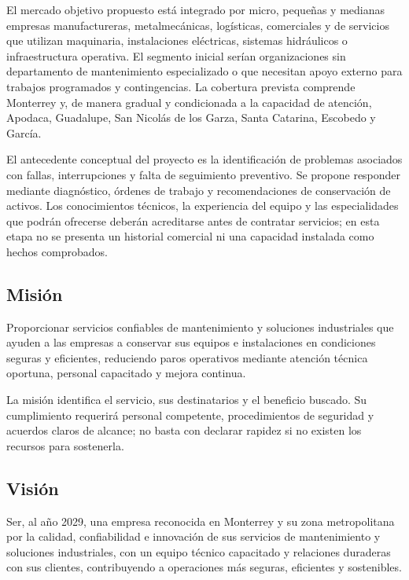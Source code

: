 {El mercado objetivo propuesto está integrado por micro, pequeñas y medianas empresas manufactureras, metalmecánicas, logísticas, comerciales y de servicios que utilizan maquinaria, instalaciones eléctricas, sistemas hidráulicos o infraestructura operativa. El segmento inicial serían organizaciones sin departamento de mantenimiento especializado o que necesitan apoyo externo para trabajos programados y contingencias. La cobertura prevista comprende Monterrey y, de manera gradual y condicionada a la capacidad de atención, Apodaca, Guadalupe, San Nicolás de los Garza, Santa Catarina, Escobedo y García.

El antecedente conceptual del proyecto es la identificación de problemas asociados con fallas, interrupciones y falta de seguimiento preventivo. Se propone responder mediante diagnóstico, órdenes de trabajo y recomendaciones de conservación de activos. Los conocimientos técnicos, la experiencia del equipo y las especialidades que podrán ofrecerse deberán acreditarse antes de contratar servicios; en esta etapa no se presenta un historial comercial ni una capacidad instalada como hechos comprobados.

\subsection{Misión}

Proporcionar servicios confiables de mantenimiento y soluciones industriales que ayuden a las empresas a conservar sus equipos e instalaciones en condiciones seguras y eficientes, reduciendo paros operativos mediante atención técnica oportuna, personal capacitado y mejora continua.

La misión identifica el servicio, sus destinatarios y el beneficio buscado. Su cumplimiento requerirá personal competente, procedimientos de seguridad y acuerdos claros de alcance; no basta con declarar rapidez si no existen los recursos para sostenerla.

\subsection{Visión}

Ser, al año 2029, una empresa reconocida en Monterrey y su zona metropolitana por la calidad, confiabilidad e innovación de sus servicios de mantenimiento y soluciones industriales, con un equipo técnico capacitado y relaciones duraderas con sus clientes, contribuyendo a operaciones más seguras, eficientes y sostenibles.

}
